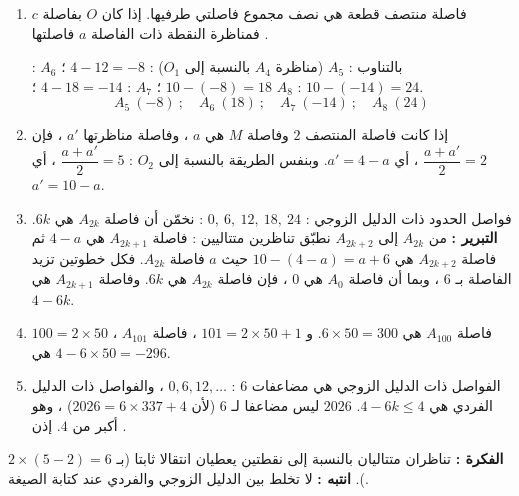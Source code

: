 \documentclass[12pt,a4paper]{article}
\begin{document}
\begin{corr}[title={تركيب : تناظرات متتالية}, stars=4, source={Axiomaths}]
\begin{enumerate}[itemsep=14pt]
\begin{center}
  \end{center}
  \item\leavevmode
  \begin{prop}
  فاصلة منتصف قطعة هي نصف مجموع فاصلتي طرفيها. إذا كان $O$ بفاصلة $c$ فمناظرة النقطة ذات الفاصلة $a$ فاصلتها .
  \end{prop}
  بالتناوب : $A_5$ (مناظرة $A_4$ بالنسبة إلى $O_1$) : $4-12=-8$ ؛ $A_6$ : $10-(-8)=18$ ؛ $A_7$ : $4-18=-14$ ؛ $A_8$ : $10-(-14)=24$.
  \[A_5\ (-8)\ ;\quad A_6\ (18)\ ;\quad A_7\ (-14)\ ;\quad A_8\ (24)\]
  \item إذا كانت فاصلة المنتصف $2$ وفاصلة $M$ هي $a$ ، وفاصلة مناظرتها $a'$ ، فإن $\dfrac{a+a'}{2}=2$ ، أي $a'=4-a$. وبنفس الطريقة بالنسبة إلى $O_2$ : $\dfrac{a+a'}{2}=5$ ، أي $a'=10-a$.
  \item فواصل الحدود ذات الدليل الزوجي : $0,\ 6,\ 12,\ 18,\ 24$ : نخمّن أن فاصلة $A_{2k}$ هي $6k$.
  \textbf{التبرير :} من $A_{2k}$ إلى $A_{2k+2}$ نطبّق تناظرين متتاليين : فاصلة $A_{2k+1}$ هي $4-a$ ثم فاصلة $A_{2k+2}$ هي $10-(4-a)=a+6$ حيث $a$ فاصلة $A_{2k}$. فكل خطوتين تزيد الفاصلة بـ $6$ ، وبما أن فاصلة $A_0$ هي $0$ ، فإن فاصلة $A_{2k}$ هي $6k$.
  وفاصلة $A_{2k+1}$ هي $4-6k$.
  \item $100=2\times50$ ، فاصلة $A_{100}$ هي $6\times50=300$. و $101=2\times50+1$ ، فاصلة $A_{101}$ هي $4-6\times50=-296$.
  \item الفواصل ذات الدليل الزوجي هي مضاعفات $6$ : $0,6,12,\ldots$ ، والفواصل ذات الدليل الفردي هي $4-6k\leq4$. $2026$ ليس مضاعفا لـ $6$ (لأن $2026=6\times337+4$) ، وهو أكبر من $4$. إذن .
\end{enumerate}
\textbf{الفكرة :} تناظران متتاليان بالنسبة إلى نقطتين يعطيان انتقالا ثابتا (بـ $2\times(5-2)=6$). \quad \textbf{انتبه :} لا تخلط بين الدليل الزوجي والفردي عند كتابة الصيغة.
\end{corr}
\end{document}
